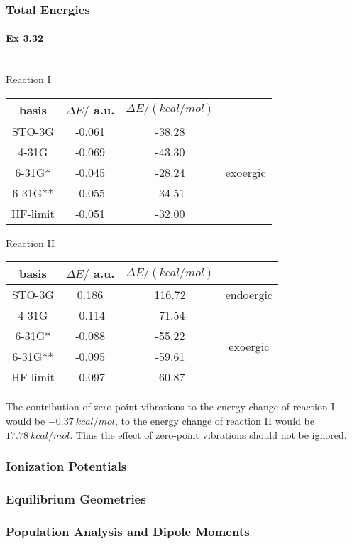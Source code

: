 \documentclass[a4paper]{article}
\newcommand{\ex}[1]{\paragraph{Ex #1}}
\numberwithin{equation}{subsection}
\begin{document}
\subsubsection{Total Energies}
\ex{3.32}~\\
Reaction I
\begin{table}[H]
	\begin{tabular}{ccc|c}
		\hline
		basis & $ \Delta E /  $ a.u.& $ \Delta E /(\si{kcal/mol}) $& \\
		\hline
		STO-3G   & -0.061 & -38.28 &\\
		4-31G    & -0.069 & -43.30 &\\
		6-31G*   & -0.045 & -28.24 & exoergic\\ 
		6-31G**  & -0.055 &	-34.51 & \\
		HF-limit & -0.051 & -32.00 &\\
		\hline		
	\end{tabular}
\end{table}
Reaction II
\begin{table}[H]
	\begin{tabular}{ccc|c}
		\hline
		basis & $ \Delta E /  $ a.u.& $ \Delta E /(\si{kcal/mol}) $ &\\
		\hline
		STO-3G   &  0.186 &	116.72 & endoergic	\\ \cline{4-4}
		4-31G    & -0.114 &	-71.54 & \multirow{4}{*}{exoergic}\\
		6-31G*   & -0.088 &	-55.22 &\\
		6-31G**  & -0.095 &	-59.61 &\\
		HF-limit & -0.097 &	-60.87 &\\
		\hline	
	\end{tabular}
\end{table}
The contribution of zero-point vibrations to the energy change of reaction I would be $ \SI{-0.37}{kcal/mol} $, to the energy change of reaction II would be $ \SI{17.78}{kcal/mol} $. Thus the effect of zero-point vibrations should not be ignored.

\subsubsection{Ionization Potentials}

\subsubsection{Equilibrium Geometries}

\subsubsection{Population Analysis and Dipole Moments}
\end{document}
